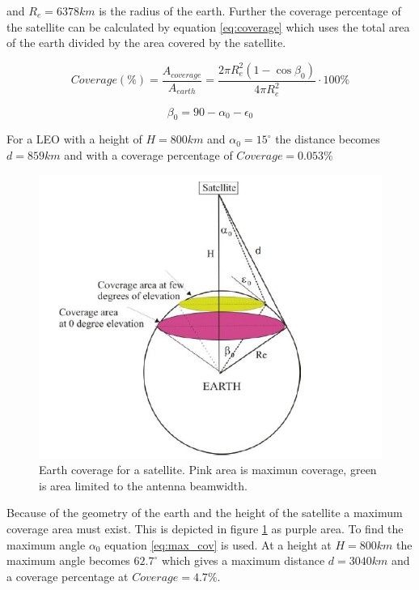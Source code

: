 and $R_e = 6378km$ is the radius of the earth. Further the coverage percentage of the satellite can be calculated by equation \ref{eq:coverage} which uses the total area of the earth divided by the area covered by the satellite. 

\begin{equation}
Coverage(\%) = \frac{A_{coverage}}{A_{earth}} = \frac{2 \pi R_e^2 ( 1 - \cos{\beta_0})}{4 \pi R_e^2}\cdot 100\%
\end{equation}
\label{eq:coverage} 

\begin{equation}
\beta_0 = 90 - \alpha_0 -\epsilon_0
\end{equation}

For a LEO with a height of $H = 800km$ and $\alpha_0 = 15^\circ$ the distance becomes $d = 859km$ and with a coverage percentage of $Coverage = 0.053 \%$

\begin{figure}[H]
\centering 
\includegraphics[scale = 0.7]{figures/linkbudget/sat_coverage.png}
\caption{Earth coverage for a satellite. Pink area is maximun coverage, green is area limited to the antenna beamwidth. \citep{Cakaj2014}}
\label{fig:cov_sat}
\end{figure} 

Because of the geometry of the earth and the height of the satellite a maximum coverage area must exist. This is depicted in figure \ref{fig:cov_sat} as purple area. To find the maximum angle $\alpha_0$ equation \ref{eq:max_cov} is used. At a height at $H=800km$ the maximum angle becomes $62.7^\circ$ which gives a maximum distance $d = 3040km$ and a coverage percentage at $Coverage = 4.7\%$.


